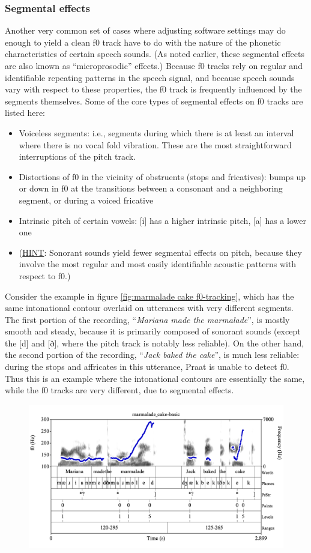\documentclass[11pt, twoside]{memoir}
\def\langtext#1{\textit{#1}}
\begin{document}
{{{\subsubsection{Segmental effects}\label{sec:segmental-effects}
Another very common set of cases where adjusting software settings may do enough to yield a clean f0 track have to do with the nature of the phonetic characteristics of certain speech sounds. (As noted earlier, these segmental effects are also known as “microprosodic” effects.) Because f0 tracks rely on regular and identifiable repeating patterns in the speech signal, and because speech sounds vary with respect to these properties, the f0 track is frequently influenced by the segments themselves. Some of the core types of segmental effects on f0 tracks are listed here:
\begin{itemize}
\item Voiceless segments: i.e., segments during which there is at least an interval where there is no vocal fold vibration. These are the most straightforward interruptions of the pitch track.
\item Distortions of f0 in the vicinity of obstruents (stops and fricatives): bumps up or down in f0 at the transitions between a consonant and a neighboring segment, or during a voiced fricative
\item Intrinsic pitch of certain vowels: [i] has a higher intrinsic pitch, [a] has a lower one 
\item[] (\uline{HINT}: Sonorant sounds yield fewer segmental effects on pitch, because they involve the most regular and most easily identifiable acoustic patterns with respect to f0.)
\end{itemize}
Consider the example in figure \ref{fig:marmalade cake f0-tracking}, which has the same intonational contour overlaid on utterances with very different segments. The first portion of the recording, “\langtext{Mariana made the marmalade}”, is mostly smooth and steady, because it is primarily composed of sonorant sounds (except the [d] and [ð], where the pitch track is notably less reliable). On the other hand, the second portion of the recording, “\langtext{Jack baked the cake}”, is much less reliable: during the stops and affricates in this utterance, Praat is unable to detect f0. Thus this is an example where the intonational contours are essentially the same, while the f0 tracks are very different, due to segmental effects.
\begin{figure}[H]
\centering
\includegraphics[width=.875\linewidth]{Appendix-marmalade_cake.png}

\end{figure}}}}
\end{document}
